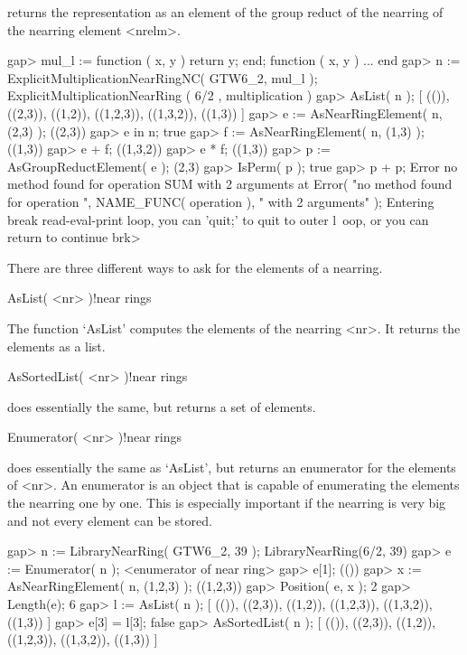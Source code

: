 returns the representation as an element of the group reduct of the nearring
of the nearring element <nrelm>.

\beginexample
    gap> mul_l := function ( x, y ) return y; end;              
    function ( x, y ) ... end
    gap> n := ExplicitMultiplicationNearRingNC( GTW6_2, mul_l );
    ExplicitMultiplicationNearRing ( 6/2 , multiplication )
    gap> AsList( n );
    [ (()), ((2,3)), ((1,2)), ((1,2,3)), ((1,3,2)), ((1,3)) ]
    gap> e := AsNearRingElement( n, (2,3) );
    ((2,3))
    gap> e in n;
    true
    gap> f := AsNearRingElement( n, (1,3) );
    ((1,3))
    gap> e + f;
    ((1,3,2))
    gap> e * f;
    ((1,3))
    gap> p := AsGroupReductElement( e );                      
    (2,3)
    gap> IsPerm( p );
    true
    gap> p + p;
    Error no method found for operation SUM with 2 arguments at
    Error( "no method found for operation ", NAME_FUNC( operation ), 
     " with 2 arguments" );
    Entering break read-eval-print loop, you can 'quit;' to quit to outer l\
    oop,
    or you can return to continue
    brk> 
\endexample

\Section{Nearring elements}


There are three different ways to ask for the elements of a nearring.

\>AsList( <nr> )!{near rings}

The function `AsList' computes the elements of the nearring <nr>. It returns
the elements as a list.

\>AsSortedList( <nr> )!{near rings}

does essentially the same, but returns a set of elements.

\>Enumerator( <nr> )!{near rings}

does essentially the same as `AsList', but returns an enumerator for the
elements of <nr>. An enumerator is an object that is capable of enumerating
the elements the nearring one by one. This is especially important if the
nearring is very big and not every element can be stored.

\beginexample
    gap> n := LibraryNearRing( GTW6_2, 39 );                    
    LibraryNearRing(6/2, 39)
    gap> e := Enumerator( n );                                  
    <enumerator of near ring>
    gap> e[1];
    (())
    gap> x := AsNearRingElement( n, (1,2,3) );
    ((1,2,3))
    gap> Position( e, x );
    2
    gap> Length(e);
    6
    gap> l := AsList( n );                                           
    [ (()), ((2,3)), ((1,2)), ((1,2,3)), ((1,3,2)), ((1,3)) ]
    gap> e[3] = l[3];
    false
    gap> AsSortedList( n );                                     
    [ (()), ((2,3)), ((1,2)), ((1,2,3)), ((1,3,2)), ((1,3)) ]
\endexample

